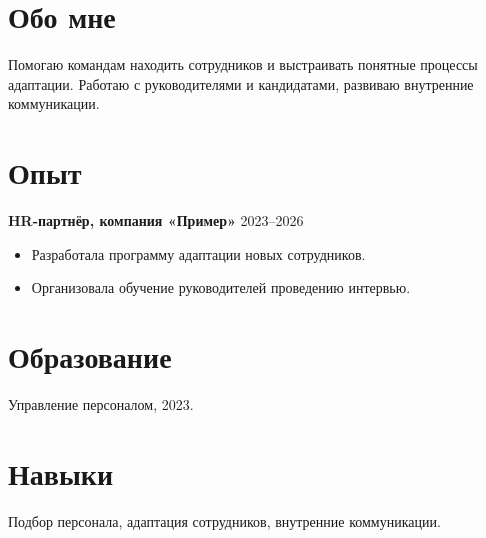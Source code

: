 \documentclass[margin,line]{resume}
\begin{document}
\begin{resume}
  \section{\mysidestyle Обо мне}
  Помогаю командам находить сотрудников и выстраивать понятные процессы
  адаптации. Работаю с руководителями и кандидатами, развиваю внутренние
  коммуникации.

  \section{\mysidestyle Опыт}
  \textbf{HR-партнёр, компания «Пример»} \hfill 2023--2026
  \begin{itemize}
    \item Разработала программу адаптации новых сотрудников.
    \item Организовала обучение руководителей проведению интервью.
  \end{itemize}

  \section{\mysidestyle Образование}
  Управление персоналом, 2023.

  \section{\mysidestyle Навыки}
  Подбор персонала, адаптация сотрудников, внутренние коммуникации.
\end{resume}
\end{document}
